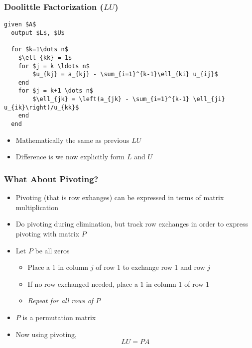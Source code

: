 \documentclass[10pt]{beamer}
\begin{document}
\begin{frame}[fragile]
\frametitle{Doolittle Factorization ($LU$)}

\begin{lstlisting}[mathescape,caption=Doolittle,label=algo:doolittle]
  given $A$
  output $L$, $U$
                               
  for $k=1\dots n$          
    $\ell_{kk} = 1$
    for $j = k \ldots n$      
        $u_{kj} = a_{kj} - \sum_{i=1}^{k-1}\ell_{ki} u_{ij}$
    end
    for $j = k+1 \dots n$
        $\ell_{jk} = \left(a_{jk} - \sum_{i=1}^{k-1} \ell_{ji}
u_{ik}\right)/u_{kk}$
    end
  end                          
\end{lstlisting}
\begin{itemize}
    \item Mathematically the same as previous $LU$ 
    \item Difference is we now explicitly form $L$ and $U$
\end{itemize}
\end{frame}
\begin{frame}
\frametitle{What About Pivoting?}
\begin{itemize}
    \item Pivoting (that is row exhanges) can be expressed in terms of matrix multiplication
    \item Do pivoting during elimination, but track row exchanges in order to express pivoting with matrix $P$
    \item Let $P$ be all zeros
    \begin{itemize}
        \item Place a $1$ in column $j$ of row 1 to exchange row 1 and row $j$
        \item If no row exchanged needed, place a $1$ in column $1$ of row $1$
        \item \emph{Repeat for all rows of $P$}
    \end{itemize}
    \item $P$ is a permutation matrix
    \item Now using pivoting,
            \[ L U = P A \]
\end{itemize}
\end{frame}
\end{document}
